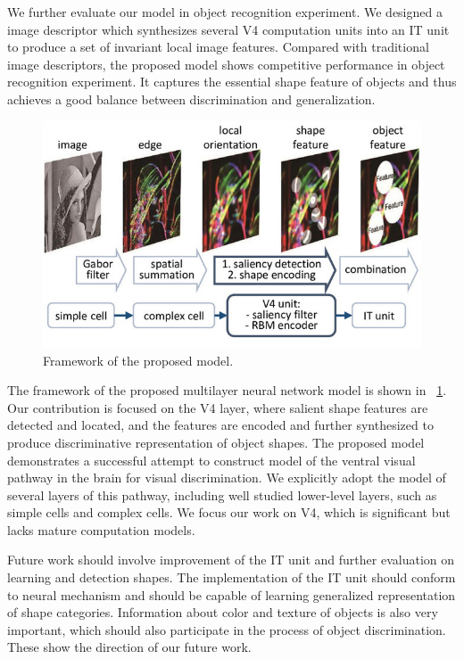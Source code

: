 \documentclass[9pt,twocolumn]{article}
\begin{document}
We further evaluate our model in object recognition experiment.
We designed a image descriptor which synthesizes several V4 computation units
into an IT unit to produce a set of invariant local image features.
Compared with traditional image descriptors,
the proposed model shows competitive performance in object recognition experiment. 
It captures the essential shape feature of objects
and thus achieves a good balance between discrimination and generalization.

\begin{figure}
\centering
\includegraphics[width=0.9\linewidth]{images/fig-17.jpg}
\caption{Framework of the proposed model.}
\label{fig:17}
\end{figure}

The framework of the proposed multilayer neural network model is shown in \figurename~\ref{fig:17}.
Our contribution is focused on the V4 layer,
where salient shape features are detected and located,
and the features are encoded and further synthesized to produce discriminative representation of object shapes.
The proposed model demonstrates a successful attempt to construct model of the ventral visual pathway
in the brain for visual discrimination.
We explicitly adopt the model of several layers of this pathway,
including well studied lower-level layers, such as simple cells and complex cells.
We focus our work on V4, which is significant but lacks mature computation models.

Future work should involve improvement of the IT unit and further evaluation on learning and detection shapes.
The implementation of the IT unit should conform to neural mechanism
and should be capable of learning generalized representation of shape categories.
Information about color and texture of objects is also very important,
which should also participate in the process of object discrimination.
These show the direction of our future work.



\end{document}
